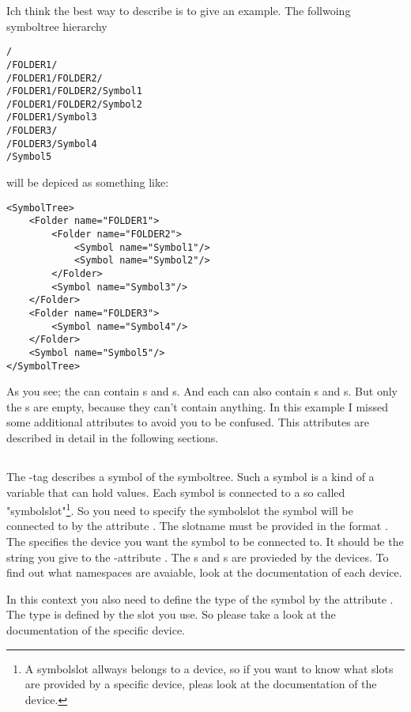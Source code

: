 Ich think the best way to describe is to give an example. The follwoing symboltree hierarchy
\begin{verbatim}
/
/FOLDER1/
/FOLDER1/FOLDER2/
/FOLDER1/FOLDER2/Symbol1
/FOLDER1/FOLDER2/Symbol2
/FOLDER1/Symbol3
/FOLDER3/
/FOLDER3/Symbol4
/Symbol5
\end{verbatim}
will be depiced as something like:
\begin{verbatim}
<SymbolTree>
    <Folder name="FOLDER1">
        <Folder name="FOLDER2">
            <Symbol name="Symbol1"/>
            <Symbol name="Symbol2"/>
        </Folder>
        <Symbol name="Symbol3"/>
    </Folder>    
    <Folder name="FOLDER3">
        <Symbol name="Symbol4"/>
    </Folder>
    <Symbol name="Symbol5"/>
</SymbolTree>
\end{verbatim}
As you see; the  can contain s and s. And each  can
also contain s and s. But only the s are empty, because they can't contain
anything. In this example I missed some additional attributes to avoid you to be confused. This attributes are described 
in detail in the following sections.

\subsection{}
The -tag describes a symbol of the symboltree. Such a symbol is a kind of a variable that can hold values.
Each symbol is connected to a so called "symbolslot"\footnote{A symbolslot allways belongs to a device, so if you want to know 
what slots are provided by a specific device, pleas look at the documentation of the device.}. So you need to specify the 
symbolslot the symbol will be connected to by the attribute . The slotname must be provided in the format 
. The  specifies the device you want the symbol to be
connected to. It should be the string you give to the -attribute . The s and
s are provieded by the devices. To find out what namespaces are avaiable, look at the documentation of 
each device.

In this context you also need to define the type of the symbol by the attribute . The type is defined by the
slot you use. So please take a look at the documentation of the specific device.


